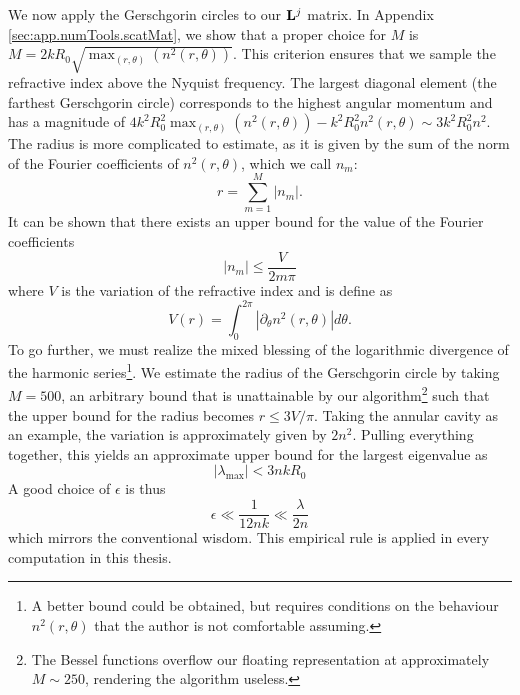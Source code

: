We now apply the Gerschgorin circles to our $\mathbf{L}^j$ matrix. 
In Appendix \ref{sec:app.numTools.scatMat}, we show that a proper choice for $M$
is $M=2kR_0\sqrt{\mathop{\max}_{(r,\theta)}\left(n^2(r,\theta)\right)}$. This criterion
ensures that we sample the refractive index above the Nyquist frequency. The largest
diagonal element (the farthest Gerschgorin circle) corresponds
to the highest angular momentum and has a magnitude of 
$4k^2R_0^2\mathop{\max}_{(r,\theta)}\left(n^2(r,\theta)\right)-k^2R_0^2n^2(r,\theta)\sim3k^2R_0^2n^2$.
The radius is more complicated to estimate, as it is given by the sum of the norm
of the Fourier coefficients of $n^2(r,\theta)$, which we call $n_m$:
  \begin{equation}
   r = \sum_{m=1}^M |n_m|.
  \end{equation}
It can be shown that there exists an upper bound for the value of the
Fourier coefficients \cite{JAC1920}
  \begin{equation}
   |n_m| \leq \frac{V}{2m\pi}
  \end{equation}
where $V$ is the variation of the refractive index and is define as
  \begin{equation}
   V(r) = \int_0^{2\pi}\left|\partial_\theta n^2(r,\theta)\right|d\theta.
  \end{equation}
To go further, we must realize the mixed blessing of the logarithmic
divergence of the harmonic series\footnote{A better bound could be obtained, but requires conditions
on the behaviour $n^2(r,\theta)$ that the author is not comfortable assuming.}. We estimate the radius
of the Gerschgorin circle by taking $M=500$, an arbitrary bound
that is unattainable by our algorithm\footnote{The Bessel functions overflow our floating representation at approximately $M\sim250$,
rendering the algorithm useless.}
such that the upper bound for the radius becomes $r\leq 3V/\pi$. Taking the annular
cavity as an example, the variation is approximately given by 
$2n^2$. Pulling everything together, this yields an approximate upper
bound for the largest eigenvalue as
  \begin{equation}
   |\lambda_\text{max}| < 3nkR_0
  \end{equation}
A good choice of $\epsilon$ is thus
  \begin{equation}
   \epsilon \ll \frac{1}{12nk} \ll \frac{\lambda}{2n}
  \end{equation}
which mirrors the conventional wisdom. This empirical rule
is applied in every computation in this thesis.

